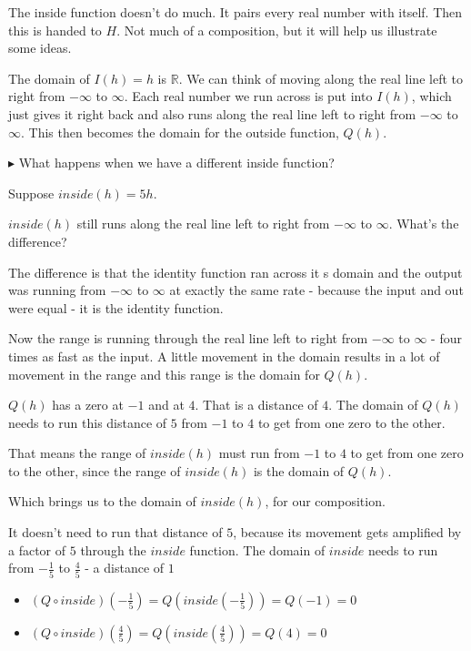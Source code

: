 \documentclass{ximera}
\begin{document}
The inside function doesn't do much.  It pairs every real number with itself.  Then this is handed to $H$. Not much of a composition, but it will help us illustrate some ideas.



The domain of $I(h)=h$ is \textbf{$\mathbb{R}$}.  We can think of moving along the real line left to right from $-\infty$ to $\infty$.  Each real number we run across is put into $I(h)$, which just gives it right back and also runs along the real line left to right from $-\infty$ to $\infty$.  This then becomes the domain for the outside function, $Q(h)$.



$\blacktriangleright$  What happens when we have a different inside function?


Suppose $inside(h) = 5h$.


$inside(h)$ still runs along the real line left to right from $-\infty$ to $\infty$. What's the difference?

The difference is that the identity function ran across it s domain and the output was running from $-\infty$ to $\infty$ at exactly the same rate - because the input and out were equal - it is the identity function.


Now the range is running through the real line left to right from $-\infty$ to $\infty$ - four times as fast as the input. A little movement in the domain results in a lot of movement in the range and this range is the domain for $Q(h)$.


$Q(h)$ has a zero at $-1$ and at $4$.  That is a distance of $4$. The domain of $Q(h)$ needs to run this distance of $5$ from $-1$ to $4$ to get from one zero to the other.


That means the range of $inside(h)$ must run from  $-1$ to $4$ to get from one zero to the other, since the range of $inside(h)$ is the domain of $Q(h)$.

Which brings us to the domain of $inside(h)$, for our composition. 

It doesn't need to run that distance of $5$, because its movement gets amplified by a factor of $5$ through the $inside$ function.  The domain of $inside$ needs to run from $-\frac{1}{5}$ to $\frac{4}{5}$ - a distance of $1$




\begin{itemize}
\item $(Q \circ inside)\left(-\frac{1}{5}\right) = Q\left(inside\left(-\frac{1}{5}\right)\right) = Q(-1) = 0$
\item $(Q \circ inside)\left(\frac{4}{5}\right) = Q\left(inside\left(\frac{4}{5}\right)\right) = Q(4) = 0$
\end{itemize}
\end{document}
